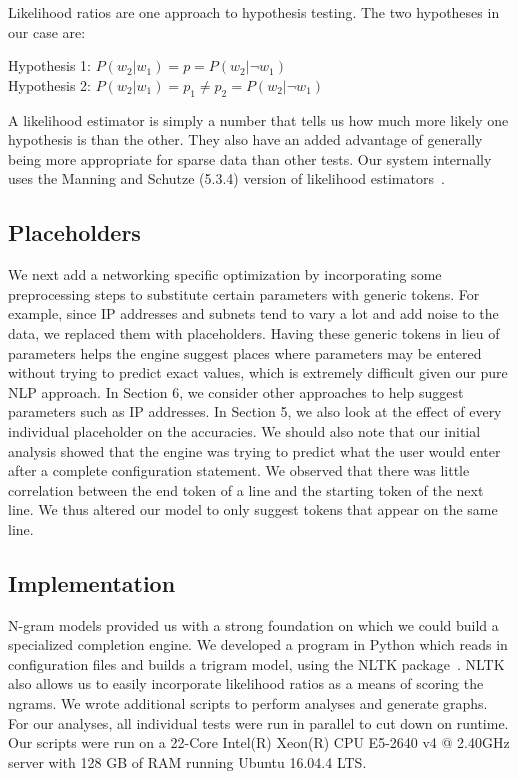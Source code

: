 Likelihood ratios are one approach to hypothesis testing. The two hypotheses in our case are:

\begin{center}
Hypothesis 1: $P(w_2|w_1) = p = P(w_2|\neg w_1)$ \\
Hypothesis 2: $P(w_2|w_1) = p_1 \neq p_2 = P(w_2|\neg w_1)$	\\	
\end{center}

A likelihood estimator is simply a number that tells us how much more likely one hypothesis is than the other. They also have an added advantage of generally being more appropriate for sparse data than other tests. Our system internally uses the Manning and Schutze (5.3.4) version of likelihood estimators~\cite{manning}.

\subsection{Placeholders}
We next add a networking specific optimization by incorporating some preprocessing steps to substitute certain parameters with generic tokens. For example, since IP addresses and subnets tend to vary a lot and add noise to the data, we replaced them with placeholders. Having these generic tokens in lieu of parameters helps the engine suggest places where parameters may be entered without trying to predict exact values, which is extremely difficult given our pure NLP approach. In Section 6, we consider other approaches to help suggest parameters such as IP addresses. In Section 5, we also look at the effect of every individual placeholder on the accuracies. We should also note that our initial analysis showed that the engine was trying to predict what the user would enter after a complete configuration statement. We observed that there was little correlation between the end token of a line and the starting token of the next line. We thus altered our model to only suggest tokens that appear on the same line.\\

\subsection{Implementation}

N-gram models provided us with a strong foundation on which we could build a specialized completion engine. We developed a program in Python which reads in configuration files and builds a trigram model, using the NLTK package~\cite{nltk}. NLTK also allows us to easily incorporate likelihood ratios as a means of scoring the ngrams. We wrote additional scripts to perform analyses and generate graphs. For our analyses, all individual tests were run in parallel to cut down on runtime. Our scripts were run on a 22-Core Intel(R) Xeon(R) CPU E5-2640 v4 @ 2.40GHz server with 128 GB of RAM running Ubuntu 16.04.4 LTS.\\ 



